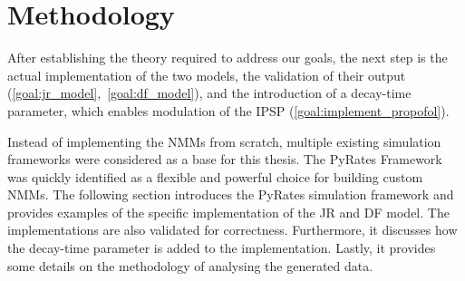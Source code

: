 \chapter{Methodology}\label{ch:methodology}
After establishing the theory required to address our goals,
the next step is the actual implementation of the two models,
the validation of their output (\ref{goal:jr_model},~\ref{goal:df_model}),
and the introduction of a decay-time parameter, which enables modulation of the IPSP (\ref{goal:implement_propofol}).

Instead of implementing the NMMs from scratch,
multiple existing simulation frameworks were considered as a base for this thesis.
The PyRates Framework~\cite{gast_pyratespython_2019} was quickly identified as a flexible and powerful choice
for building custom NMMs.
The following section introduces the PyRates simulation framework
and provides examples of the specific implementation of the JR and DF model.
The implementations are also validated for correctness.
Furthermore, it discusses how the decay-time parameter is added to the implementation.
Lastly, it provides some details on the methodology of analysing the generated data.


